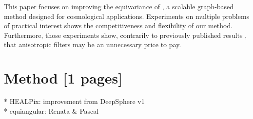 \documentclass{article} %
\newcommand{\norm}[1]{\left\lVert#1\right\rVert}
\newcommand{\todo}[1]{{\color[rgb]{.6,.1,.6}{#1}}}
\begin{document}
This paper focuses on improving the equivariance of \cite{perraudin2019deepspherecosmo}, a scalable graph-based method designed for cosmological applications.
\todo{cite RLGM paper}
Experiments on multiple problems of practical interest shows the competitiveness and flexibility of our method.
Furthermore, those experiments show, contrarily to previously published results \cite{cohen2019gauge}, that anisotropic filters may be an unnecessary price to pay.

\section{Method [1 pages]}

* HEALPix: improvement from DeepSphere v1 \cite{perraudin2019deepspherecosmo} \\
* equiangular: Renata \& Pascal \\

\end{document}
